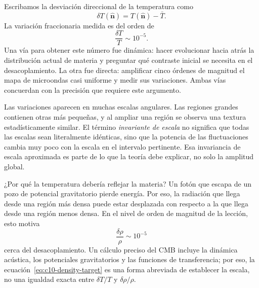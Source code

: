 Escribamos la desviación direccional de la temperatura como
\[
\delta T(\hat{\mathbf n})=T(\hat{\mathbf n})-\bar T.
\]
La variación fraccionaria medida es del orden de
\begin{equation}
\frac{\delta T}{T}\sim10^{-5}.
\label{eq:c10-cmb-anisotropy}
\end{equation}
Una vía para obtener este número fue dinámica: hacer evolucionar hacia atrás la distribución actual de materia y preguntar qué contraste inicial se necesita en el desacoplamiento. La otra fue directa: amplificar cinco órdenes de magnitud el mapa de microondas casi uniforme y medir sus variaciones. Ambas vías concuerdan con la precisión que requiere este argumento.

Las variaciones aparecen en muchas escalas angulares. Las regiones grandes contienen otras más pequeñas, y al ampliar una región se observa una textura estadísticamente similar. El término \emph{invariante de escala} no significa que todas las escalas sean literalmente idénticas, sino que la potencia de las fluctuaciones cambia muy poco con la escala en el intervalo pertinente. Esa invariancia de escala aproximada es parte de lo que la teoría debe explicar, no solo la amplitud global.

¿Por qué la temperatura debería reflejar la materia? Un fotón que escapa de un pozo de potencial gravitatorio pierde energía. Por eso, la radiación que llega desde una región más densa puede estar desplazada con respecto a la que llega desde una región menos densa. En el nivel de orden de magnitud de la lección, esto motiva
\begin{equation}
\frac{\delta\rho}{\rho}\sim10^{-5}
\label{eq:c10-density-target}
\end{equation}
cerca del desacoplamiento. Un cálculo preciso del CMB incluye la dinámica acústica, los potenciales gravitatorios y las funciones de transferencia; por eso, la ecuación~\eqref{eq:c10-density-target} es una forma abreviada de establecer la escala, no una igualdad exacta entre \(\delta T/T\) y \(\delta\rho/\rho\).

\begin{classroomqa}
\end{classroomqa}

